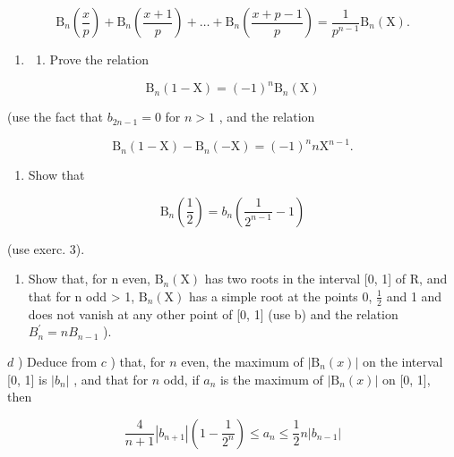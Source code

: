 \[
\mathrm{B} _ {n} \left(\frac {x}{p}\right) + \mathrm{B} _ {n} \left(\frac {x + 1}{p}\right) + \dots + \mathrm{B} _ {n} \left(\frac {x + p - 1}{p}\right) = \frac {1}{p ^ {n - 1}} \mathrm{B} _ {n} (\mathrm{X}).
\]

\begin{enumerate}
\def\labelenumi{\arabic{enumi})}
\setcounter{enumi}{3}
\tightlist
\item
  \begin{enumerate}
  \def\labelenumii{\alph{enumii})}
  \tightlist
  \item
    Prove the relation
  \end{enumerate}
\end{enumerate}

\[
\mathrm{B} _ {n} (1 - \mathrm{X}) = (- 1) ^ {n} \mathrm{B} _ {n} (\mathrm{X})
\]

(use the fact that \(b_{2n - 1} = 0\) for \(n > 1\) , and the relation

\[
\mathrm{B} _ {n} (1 - \mathrm{X}) - \mathrm{B} _ {n} (- \mathrm{X}) = (- 1) ^ {n} n \mathrm{X} ^ {n - 1}.
\]

\begin{enumerate}
\def\labelenumi{\alph{enumi})}
\setcounter{enumi}{1}
\tightlist
\item
  Show that
\end{enumerate}

\[
\mathrm{B} _ {n} \left(\frac {1}{2}\right) = b _ {n} \left(\frac {1}{2 ^ {n - 1}} - 1\right)
\]

(use exerc. 3).

\begin{enumerate}
\def\labelenumi{\alph{enumi})}
\setcounter{enumi}{2}
\tightlist
\item
  Show that, for n even, \(\mathrm{B}_{n}(\mathrm{X})\) has two roots in the interval {[}0, 1{]} of R, and that for n odd \textgreater{} 1, \(\mathrm{B}_{n}(\mathrm{X})\) has a simple root at the points 0, \(\frac{1}{2}\) and 1 and does not vanish at any other point of {[}0, 1{]} (use b) and the relation \(B_{n}^{\prime}=nB_{n-1}\) ).
\end{enumerate}

\(d\) ) Deduce from \(c\) ) that, for \(n\) even, the maximum of \(|\mathrm{B}_n(x)|\) on the interval {[}0, 1{]} is \(|b_n|\) , and that for \(n\) odd, if \(a_{n}\) is the maximum of \(|\mathrm{B}_n(x)|\) on {[}0, 1{]}, then

\[
\frac {4}{n + 1} \left| b _ {n + 1} \right| \left(1 - \frac {1}{2 ^ {n}}\right) \leqslant a _ {n} \leqslant \frac {1}{2} n \left| b _ {n - 1} \right|
\]


